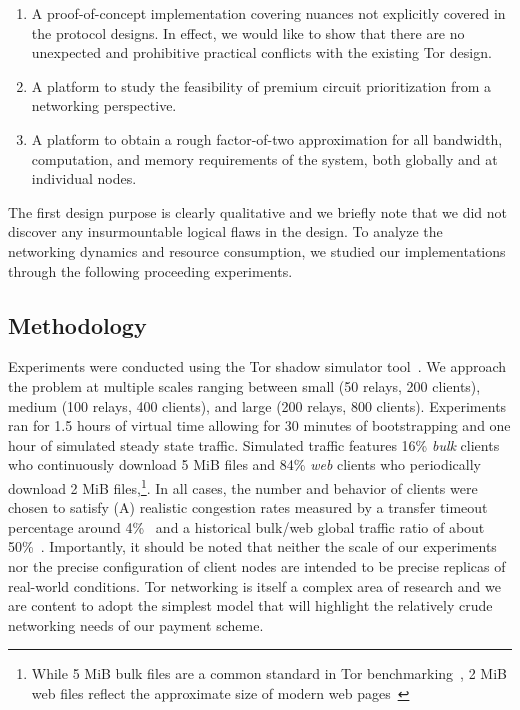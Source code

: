 \begin{enumerate}
\item A proof-of-concept implementation covering nuances not explicitly
  covered in the protocol designs. In effect, we would like to show that there
  are no unexpected and prohibitive practical conflicts with the existing Tor
  design.
\item A platform to study the feasibility of premium circuit
  prioritization from a networking perspective.
\item A platform to obtain a rough factor-of-two approximation for all
  bandwidth, computation, and memory requirements of the system, both globally
  and at individual nodes.
\end{enumerate}

The first design purpose is clearly qualitative and we briefly note that we did
not discover any insurmountable logical flaws in the design. To analyze the
networking dynamics and resource consumption, we studied our implementations
through the following proceeding experiments.

\subsection{Methodology}
\label{subsec:methodology}

Experiments were conducted using the Tor shadow simulator
tool~\cite{jansen2011shadow}.
We approach the problem at multiple scales ranging between small (50 relays, 200
clients), medium (100 relays, 400 clients), and large (200 relays, 800
clients). Experiments ran for 1.5 hours of virtual time allowing for 30 minutes
of bootstrapping and one hour of simulated steady state traffic. Simulated
traffic features 16\% \emph{bulk} clients who continuously download 5 MiB files
and 84\% \emph{web} clients who periodically download 2 MiB
files,\footnote{While 5 MiB bulk files are a common standard in Tor
  benchmarking~\cite{portal2018tormetrics}, 2 MiB web files reflect the
  approximate size of modern web pages~\cite{team2018httparchive}}. In all cases, the number and behavior of
clients were chosen to satisfy (A) realistic congestion rates measured by a
transfer timeout percentage around 4\%~\cite{portal2018tormetrics} and a historical
bulk/web global traffic ratio of about 50\%~\cite{chaabane2010digging,
  mccoy2008shining}. Importantly, it should be noted that neither the scale of
our experiments nor the precise configuration of client nodes are intended to be
precise replicas of real-world conditions. Tor networking is itself a complex
area of research and we are content to adopt the simplest model that will
highlight the relatively crude networking needs of our payment scheme.

